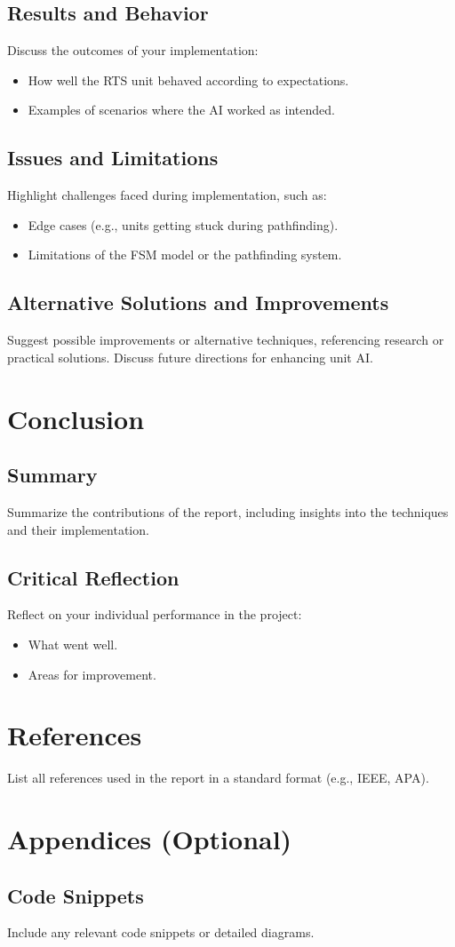 \documentclass[a4paper,12pt]{article}
\begin{document}
\subsection{Results and Behavior}
Discuss the outcomes of your implementation:
\begin{itemize}
    \item How well the RTS unit behaved according to expectations.
    \item Examples of scenarios where the AI worked as intended.
\end{itemize}

\subsection{Issues and Limitations}
Highlight challenges faced during implementation, such as:
\begin{itemize}
    \item Edge cases (e.g., units getting stuck during pathfinding).
    \item Limitations of the FSM model or the pathfinding system.
\end{itemize}

\subsection{Alternative Solutions and Improvements}
Suggest possible improvements or alternative techniques, referencing research or practical solutions. Discuss future directions for enhancing unit AI.

\section{Conclusion}
\subsection{Summary}
Summarize the contributions of the report, including insights into the techniques and their implementation.

\subsection{Critical Reflection}
Reflect on your individual performance in the project:
\begin{itemize}
    \item What went well.
    \item Areas for improvement.
\end{itemize}

\section*{References}
List all references used in the report in a standard format (e.g., IEEE, APA).

\section*{Appendices (Optional)}
\subsection*{Code Snippets}
Include any relevant code snippets or detailed diagrams.
\end{document}
